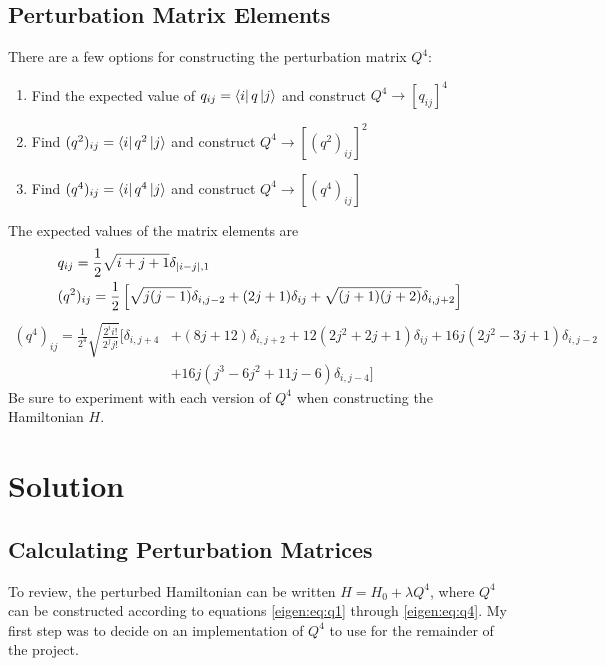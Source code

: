 \documentclass[11pt, a4paper]{article}
\begin{document}
\subsection{Perturbation Matrix Elements}
There are a few options for constructing the perturbation matrix $ Q^4 $:
\begin{enumerate}
	\item Find the expected value of $ q_{ij} = \bra{i}q\ket{j} $ and construct $ Q^4 \to [q_{ij}]^{4} $
	\item Find $ (q^{2})_{ij} = \bra{i}q^{2}\ket{j} $ and construct $ Q^{4} \to [(q^{2})_{ij}]^{2}  $
	\item Find $ (q^{4})_{ij} = \bra{i}q^{4}\ket{j} $ and construct $ Q^{4} \to [(q^{4})_{ij}] $
\end{enumerate} 
The expected values of the matrix elements are
\begin{align}
	&q_{ij} = \frac{1}{2} \sqrt{i + j + 1} \delta_{\abs{i-j}, 1} \label{eigen:eq:q1}\\
	&(q^{2})_{ij} = \frac{1}{2}\left[\sqrt{j(j-1)}\delta_{i, j-2} + (2j+1)\delta_{ij} + \sqrt{(j+1)(j+2)}\delta_{i, j+2}\right] \label{eigen:eq:q2}
\end{align}\vspace{-5mm}
\begin{align}
	 (q^{4})_{ij} = \frac{1}{2^{4}}\sqrt{\frac{2^{i}i!}{2^{j}j!}}\Big[ \delta_{i, j+4} &+ (8j+12)\delta_{i,j+2} + 12(2j^{2} + 2j + 1)\delta_{ij} + 16j(2j^{2} - 3j +1)\delta_{i, j-2}\nonumber\\
	& + 16j(j^{3} - 6j^{2} + 11j - 6)\delta_{i, j-4}\Big] \label{eigen:eq:q4}
\end{align}
Be sure to experiment with each version of $ Q^{4} $ when constructing the Hamiltonian $ H $. 


\section{Solution} \label{eigen:s:solution}

\subsection{Calculating Perturbation Matrices}
To review, the perturbed Hamiltonian can be written $ H = H_{0} + \lambda Q^{4} $, where $ Q^{4} $ can be constructed according to equations \ref{eigen:eq:q1} through \ref{eigen:eq:q4}. My first step was to decide on an implementation of $ Q^{4} $ to use for the remainder of the project.
\end{document}
